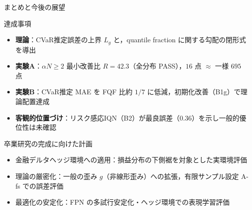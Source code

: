 \documentclass[aspectratio=169, 10pt]{beamer}
\newcommand{\blue}[1]{\textcolor{blue!80!black}{#1}}
\newcommand{\Lg}{L_g}
\begin{document}
\begin{frame}{まとめと今後の展望}
  \begin{exampleblock}{達成事項}
    \begin{itemize}
      \item \textbf{理論}：CVaR推定誤差の上界 $\Lg$ と，quantile fraction に関する勾配の閉形式を導出
      \item \textbf{実験A}：$\alpha N\ge 2$ 最小改善比 \alert{$R=42.3$}（全分布 PASS），$16$ 点 $\approx$ 一様 $695$ 点
      \item \textbf{実験B}：CVaR推定 MAE を FQF 比\alert{約 $1/7$} に低減，初期化改善（B1g）で理論配置達成
      \item \textbf{客観的位置づけ}：リスク感応IQN（B2）が最良誤差（$0.36$）を示し一般的優位性は未確認
    \end{itemize}
  \end{exampleblock}
  \begin{block}{卒業研究の完成に向けた計画}
    \begin{itemize}
      \item \blue{金融デルタヘッジ環境}への適用：損益分布の下側裾を対象とした実環境評価
      \item \blue{理論の厳密化}：一般の歪み $g$（非線形歪み）への拡張，有限サンプル設定 A-fs での誤差評価
      \item \blue{最適化の安定化}：FPN の多試行安定化・ヘッジ環境での表現学習評価
    \end{itemize}
  \end{block}
\end{frame}
\end{document}
